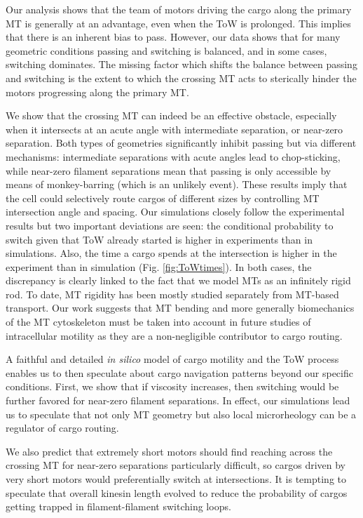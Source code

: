 Our analysis shows that the team of motors driving the cargo along the primary MT is generally at an advantage, even when the ToW is prolonged. This implies that there is an inherent bias to pass. However, our data shows that for many geometric conditions passing and switching is balanced, and in some cases, switching dominates. The missing factor which shifts the balance between passing and switching is the extent to which the crossing MT acts to sterically hinder the motors progressing along the primary MT.

We show that the crossing MT can indeed be an effective obstacle, especially when it intersects at an acute angle with intermediate separation, or near-zero separation. Both types of geometries significantly inhibit passing but via different mechanisms: intermediate separations with acute angles lead to chop-sticking, while near-zero filament separations mean that passing is only accessible by means of monkey-barring (which is an unlikely event). These results imply that the cell could selectively route cargos of different sizes by controlling MT intersection angle and spacing.
Our simulations closely follow the experimental results but two important deviations are seen: the conditional probability to switch given that ToW already started is higher in experiments than in simulations. Also, the time a cargo spends at the intersection is higher in the experiment than in simulation (Fig. \ref{fig:ToWtimes}). In both cases, the discrepancy is clearly linked to the fact that we model MTs as an infinitely rigid rod. To date, MT rigidity has been mostly studied separately from MT-based transport. Our work suggests that MT bending and more generally biomechanics of the MT cytoskeleton must be taken into account in future studies of intracellular motility as they are a non-negligible contributor to cargo routing.
                      
A faithful and detailed \textit{in silico} model of cargo motility and the ToW process enables us to then speculate about cargo navigation patterns beyond our specific conditions. First, we show that if viscosity increases, then switching would be further favored for near-zero filament separations. In effect, our simulations lead us to speculate that not only MT geometry but also local microrheology can be a regulator of cargo routing.

We also predict that extremely short motors should find reaching across the crossing MT for near-zero separations particularly difficult, so cargos driven by very short motors would preferentially switch at intersections. It is tempting to speculate that overall kinesin length evolved to reduce the probability of cargos getting trapped in filament-filament switching loops.

